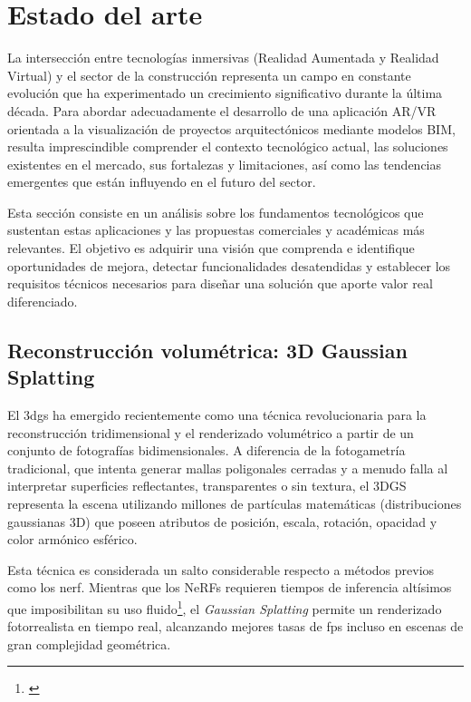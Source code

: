 \chapter{\label{estado-arte}Estado del arte}

La intersección entre tecnologías inmersivas (Realidad Aumentada y Realidad Virtual) y el sector de la construcción representa un campo en constante evolución que ha experimentado un crecimiento significativo durante la última década. Para abordar adecuadamente el desarrollo de una aplicación AR/VR orientada a la visualización de proyectos arquitectónicos mediante modelos BIM, resulta imprescindible comprender el contexto tecnológico actual, las soluciones existentes en el mercado, sus fortalezas y limitaciones, así como las tendencias emergentes que están influyendo en el futuro del sector.

Esta sección consiste en un análisis sobre los fundamentos tecnológicos que sustentan estas aplicaciones y las propuestas comerciales y académicas más relevantes. El objetivo es adquirir una visión que comprenda e identifique oportunidades de mejora, detectar funcionalidades desatendidas y establecer los requisitos técnicos necesarios para diseñar una solución que aporte valor real diferenciado.

\section{Reconstrucción volumétrica: 3D Gaussian Splatting}

El \gls{3dgs} ha emergido recientemente como una técnica revolucionaria para la reconstrucción tridimensional y el renderizado volumétrico a partir de un conjunto de fotografías bidimensionales. A diferencia de la fotogametría tradicional, que intenta generar mallas poligonales cerradas y a menudo falla al interpretar superficies reflectantes, transparentes o sin textura, el 3DGS representa la escena utilizando millones de partículas matemáticas (distribuciones gaussianas 3D) que poseen atributos de posición, escala, rotación, opacidad y color armónico esférico.

Esta técnica es considerada un salto considerable respecto a métodos previos como los \gls{nerf}. Mientras que los NeRFs requieren tiempos de inferencia altísimos que imposibilitan su uso fluido\footnote{\cite{mildenhall2020nerf}}, el \textit{Gaussian Splatting} permite un renderizado fotorrealista en tiempo real, alcanzando mejores tasas de \gls{fps} incluso en escenas de gran complejidad geométrica.

